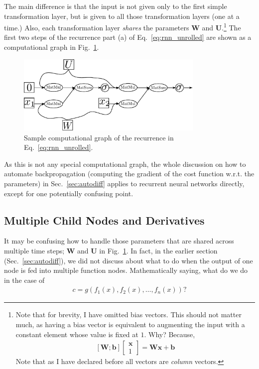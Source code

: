 \documentclass{report}
\newcommand{\vect}[1]{\mathbf{#1}}
\newcommand{\matr}[1]{\mathbf{#1}}
\newcommand{\vb}[0]{\vect{b}}
\newcommand{\vx}[0]{\vect{x}}
\newcommand{\mW}[0]{\matr{W}}
\newcommand{\mU}[0]{\matr{U}}
\begin{document}
The main difference is that the input is not given only to the first simple
transformation layer, but is given to all those transformation layers (one at a
time.) Also, each transformation layer {\em shares} the parameters $\mW$ and
$\mU$.\footnote{
    Note that for brevity, I have omitted bias vectors. This should not matter
    much, as having a bias vector is equivalent to augmenting the input with a
    constant element whose value is fixed at $1$. Why? Because,
    \begin{align*}
        \left[ \mW ; \vb \right]
    \left[ \begin{array}{c} \vx \\1 \end{array} \right]
        = \mW \vx + \vb
    \end{align*}
    Note that as I have declared before all vectors are {\em column} vectors.
} The first two steps of the recurrence part (a) of Eq.~\eqref{eq:rnn_unrolled}
are shown as a computational graph in Fig.~\ref{fig:rec_unrolled}.

\begin{figure}[ht]
    \centering
    \includegraphics[width=0.8\textwidth]{figures/comp_graph_rec1.pdf}
    \caption{
        Sample computational graph of the recurrence in
        Eq.~\eqref{eq:rnn_unrolled}.
    }
    \label{fig:rec_unrolled}
\end{figure}

As this is not any special computational graph, the whole discussion on how to
automate backpropagation (computing the gradient of the cost function w.r.t. the
parameters) in Sec.~\ref{sec:autodiff} applies to recurrent neural networks
directly, except for one potentially confusing point.

\subsection{Multiple Child Nodes and Derivatives}
\label{sec:rnn_backprop}

It may be confusing how to handle those parameters that are shared across
multiple time steps; $\mW$ and $\mU$ in Fig.~\ref{fig:rec_unrolled}. In fact, in
the earlier section (Sec.~\ref{sec:autodiff}), we did not discuss about what to
do when the output of one node is fed into multiple function nodes.
Mathematically saying, what do we do in the case of 
\begin{align*}
    c = g(f_1(x), f_2(x), \ldots, f_n(x))?
\end{align*}
\end{document}
